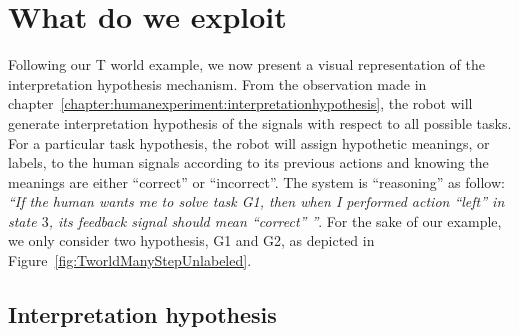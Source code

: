 


\section{What do we exploit}


Following our T world example, we now present a visual representation of the interpretation hypothesis mechanism. From the observation made in chapter~\ref{chapter:humanexperiment:interpretationhypothesis}, the robot will generate interpretation hypothesis of the signals with respect to all possible tasks. For a particular task hypothesis, the robot will assign hypothetic meanings, or labels, to the human signals according to its previous actions and knowing the meanings are either ``correct'' or ``incorrect''. The system is ``reasoning'' as follow: \textit{``If the human wants me to solve task G1, then when I performed action ``left'' in state $3$, its feedback signal should mean ``correct'' ''}. For the sake of our example, we only consider two hypothesis, G1 and G2, as depicted in Figure~\ref{fig:TworldManyStepUnlabeled}.


\subsection{Interpretation hypothesis}
\label{chapter:lfui:interpreation}

